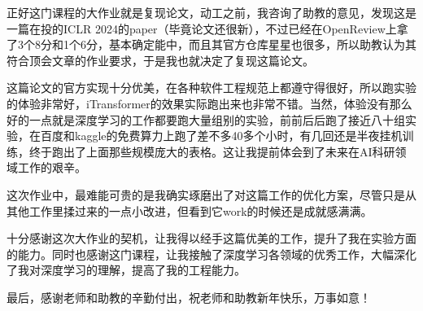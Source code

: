 \documentclass[twoside,12pt]{article}
\begin{document}
正好这门课程的大作业就是复现论文，动工之前，我咨询了助教的意见，发现这是一篇在投的ICLR 2024的paper（毕竟论文还很新），不过已经在OpenReview上拿了3个8分和1个6分，基本确定能中，而且其官方仓库星星也很多，所以助教认为其符合顶会文章的作业要求，于是我也就决定了复现这篇论文。

这篇论文的官方实现十分优美，在各种软件工程规范上都遵守得很好，所以跑实验的体验非常好，iTransformer的效果实际跑出来也非常不错。当然，体验没有那么好的一点就是深度学习的工作都要跑大量组别的实验，前前后后跑了接近八十组实验，在百度和kaggle的免费算力上跑了差不多40多个小时，有几回还是半夜挂机训练，终于跑出了上面那些规模庞大的表格。这让我提前体会到了未来在AI科研领域工作的艰辛。

这次作业中，最难能可贵的是我确实琢磨出了对这篇工作的优化方案，尽管只是从其他工作里揉过来的一点小改进，但看到它work的时候还是成就感满满。

十分感谢这次大作业的契机，让我得以经手这篇优美的工作，提升了我在实验方面的能力。同时也感谢这门课程，让我接触了深度学习各领域的优秀工作，大幅深化了我对深度学习的理解，提高了我的工程能力。

最后，感谢老师和助教的辛勤付出，祝老师和助教新年快乐，万事如意！





\vfill
\end{document}
